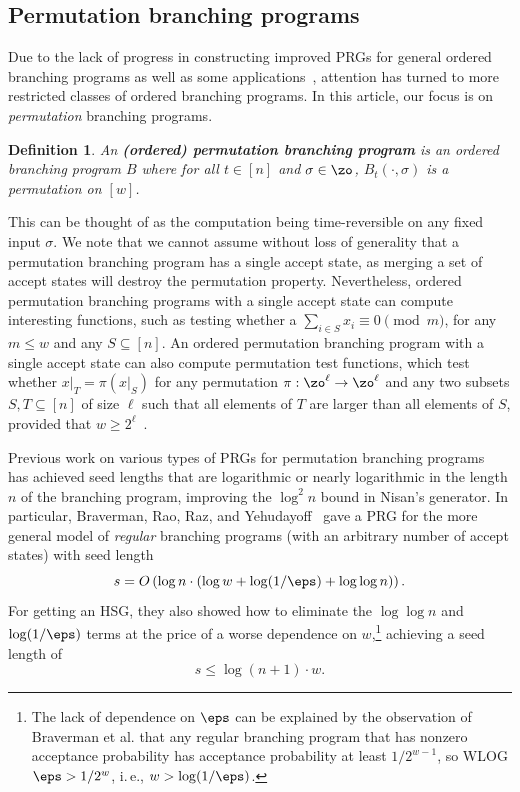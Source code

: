 \documentclass[11pt]{article}
\newtheorem{definition}[theorem]{Definition}
\newcommand{\ie}{i.\,e.}
\begin{document}
	
\subsection{Permutation branching programs}\label{subsec:PBP_overview}

Due to the lack of progress in constructing improved PRGs for general ordered branching programs as well as some applications~\cite{Indyk06,KaplanNaRe05}, attention has turned to more restricted classes of ordered branching programs.  In this %
article, %
our focus is on \emph{permutation} branching programs. %
	
	\begin{definition}\label{def:prbp}An \textbf{(ordered) permutation branching program} is an ordered branching program $B$ where for all $t \in [n]$ and $\sigma \in \zo$, $B_t(\cdot,\sigma)$ is a permutation on $[w]$. 
	\end{definition}
	This can be thought of as the computation being time-reversible on any fixed input $\sigma$. We note that we cannot assume without loss of generality that a permutation branching program has a single accept state, as merging a set of accept states will destroy the permutation property. Nevertheless, ordered permutation branching programs with a single accept state can compute interesting functions, such as testing
	whether a $\sum_{i\in S} x_i \equiv 0 \pmod m$, for any $m\leq w$ and any $S\subseteq [n]$.  An ordered permutation branching program with a single accept state can also compute permutation test functions, which test whether $x|_T = \pi(x|_S)$ for any permutation $\pi : \zo^\ell\rightarrow \zo^\ell$ and any two subsets $S,T\subseteq [n]$ of size $\ell$ such that all elements of $T$ are larger than all elements of $S$, provided that $w\geq 2^{\ell}$~\cite{HozaPyVa21}.
	
	Previous %
work %
on various types of PRGs for permutation branching programs~\cite{RozenmanVa05,ReingoldTrVa06,BravermanRaRaYe10,KouckyNiPu11,De11,Steinke12,HozaPyVa21} %
has  %
achieved seed lengths that are logarithmic or nearly logarithmic in the length $n$ of the branching program, improving the $\log^2 n$ bound in Nisan's generator. In particular, Braverman, Rao,
Raz, and Yehudayoff~\cite{BravermanRaRaYe10} gave a PRG for the more general model of \emph{regular} branching programs (with an arbitrary number of accept states) with seed length
	$$s=O\left(\log n\cdot (\log w + \log(1/\eps)+\log\log n)\right).$$
For getting an %
    HSG, they also showed how to %
    eliminate
	the $\log\log n$ and $\log(1/\eps)$ terms at the price of a worse dependence on $w$,\footnote{The lack of dependence on $\eps$ can be explained by the observation of Braverman et al. that any regular branching program that 
	has nonzero acceptance probability has acceptance probability at least
	$1/2^{w-1}$, so WLOG $\eps> 1/2^w$, \ie, $w> \log(1/\eps)$.} 
	achieving a seed length of
	$$s\leq \log(n+1) \cdot w.$$
\end{document}
